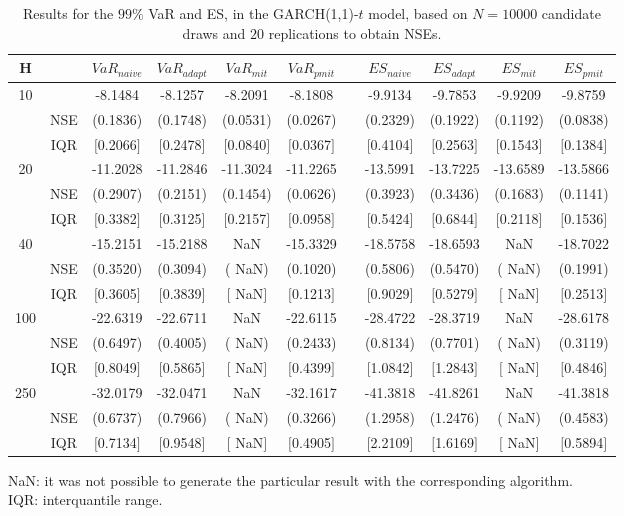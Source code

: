 \footnotesize{  
{ \renewcommand{\arraystretch}{1.3} 
\begin{table}[h] 
\centering 
\caption{Results for the $99\%$ VaR and ES, in the GARCH(1,1)-$t$ model, based on $N=10000$ candidate draws and $20$ replications to obtain NSEs.} 
\label{tab:res_algos_t_garch2_noS} 
\begin{tabular}{ccccccccccc}  
 H & & $VaR_{naive}$ & $VaR_{adapt}$ & $VaR_{mit}$  & $VaR_{pmit}$ &  & $ES_{naive}$ & $ES_{adapt}$ & $ES_{mit}$ & $ES_{pmit}$ \\ \hline 
10 & & -8.1484 & -8.1257 & -8.2091 & -8.1808 & & -9.9134 & -9.7853 & -9.9209 & -9.8759  \\ 
  & NSE & (0.1836) & (0.1748) & (0.0531) & (0.0267) & & (0.2329) & (0.1922) & (0.1192) & (0.0838)   \\ 
 & IQR & $[$0.2066$]$ & $[$0.2478$]$ & $[$0.0840$]$ & $[$0.0367$]$ & & $[$0.4104$]$ & $[$0.2563$]$ & $[$0.1543$]$ & $[$0.1384$]$  \\ [1ex] 
20 & & -11.2028 & -11.2846 & -11.3024 & -11.2265 & & -13.5991 & -13.7225 & -13.6589 & -13.5866  \\ 
  & NSE & (0.2907) & (0.2151) & (0.1454) & (0.0626) & & (0.3923) & (0.3436) & (0.1683) & (0.1141)   \\ 
 & IQR & $[$0.3382$]$ & $[$0.3125$]$ & $[$0.2157$]$ & $[$0.0958$]$ & & $[$0.5424$]$ & $[$0.6844$]$ & $[$0.2118$]$ & $[$0.1536$]$  \\ [1ex] 
40 & & -15.2151 & -15.2188 &    NaN & -15.3329 & & -18.5758 & -18.6593 &    NaN & -18.7022  \\ 
  & NSE & (0.3520) & (0.3094) & (   NaN) & (0.1020) & & (0.5806) & (0.5470) & (   NaN) & (0.1991)   \\ 
 & IQR & $[$0.3605$]$ & $[$0.3839$]$ & $[$   NaN$]$ & $[$0.1213$]$ & & $[$0.9029$]$ & $[$0.5279$]$ & $[$   NaN$]$ & $[$0.2513$]$  \\ [1ex] 
100 & & -22.6319 & -22.6711 &    NaN & -22.6115 & & -28.4722 & -28.3719 &    NaN & -28.6178  \\ 
  & NSE & (0.6497) & (0.4005) & (   NaN) & (0.2433) & & (0.8134) & (0.7701) & (   NaN) & (0.3119)   \\ 
 & IQR & $[$0.8049$]$ & $[$0.5865$]$ & $[$   NaN$]$ & $[$0.4399$]$ & & $[$1.0842$]$ & $[$1.2843$]$ & $[$   NaN$]$ & $[$0.4846$]$  \\ [1ex] 
250 & & -32.0179 & -32.0471 &    NaN & -32.1617 & & -41.3818 & -41.8261 &    NaN & -41.3818  \\ 
  & NSE & (0.6737) & (0.7966) & (   NaN) & (0.3266) & & (1.2958) & (1.2476) & (   NaN) & (0.4583)   \\ 
 & IQR & $[$0.7134$]$ & $[$0.9548$]$ & $[$   NaN$]$ & $[$0.4905$]$ & & $[$2.2109$]$ & $[$1.6169$]$ & $[$   NaN$]$ & $[$0.5894$]$  \\ [1ex] 
\hline 
\end{tabular} 
\raggedright 

\vspace{5pt}\footnotesize{NaN: it was not possible to generate the particular result with the corresponding algorithm.} \\ 
\vspace{5pt}\footnotesize{IQR: interquantile range.} 
\end{table} 
} 
} 
